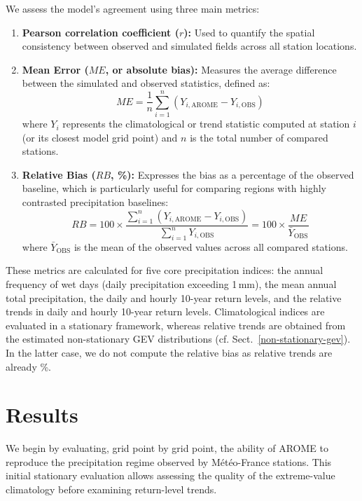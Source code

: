 \documentclass[hess, manuscript]{copernicus}
\begin{document}
We assess the model's agreement using three main metrics:
\begin{enumerate}
    \item \textbf{Pearson correlation coefficient ($r$):} Used to quantify the spatial consistency between observed and simulated fields across all station locations.
    \item \textbf{Mean Error ($ME$, or absolute bias):} Measures the average difference between the simulated and observed statistics, defined as:
    \begin{equation}
        ME = \frac{1}{n}\sum_{i=1}^{n} (Y_{i,\text{AROME}} - Y_{i,\text{OBS}})
    \end{equation}
    where $Y_i$ represents the climatological or trend statistic computed at station $i$ (or its closest model grid point) and $n$ is the total number of compared stations.
    \item \textbf{Relative Bias ($RB$, \%):} Expresses the bias as a percentage of the observed baseline, which is particularly useful for comparing regions with highly contrasted precipitation baselines:
    \begin{equation}
        RB = 100 \times \frac{\sum_{i=1}^{n} (Y_{i,\text{AROME}} - Y_{i,\text{OBS}})}{\sum_{i=1}^{n} Y_{i,\text{OBS}}} = 100 \times \frac{ME}{\bar{Y}_{\text{OBS}}}
    \end{equation}
    where $\bar{Y}_{\text{OBS}}$ is the mean of the observed values across all compared stations.
\end{enumerate}

These metrics are calculated for five core precipitation indices: the annual frequency of wet days (daily precipitation exceeding 1\,mm), the mean annual total precipitation, the daily and hourly 10-year return levels, and the relative trends in daily and hourly 10-year return levels. Climatological indices are evaluated in a stationary framework, whereas relative trends are obtained from the estimated non-stationary GEV distributions (cf. Sect.~\ref{non-stationary-gev}). In the latter case, we do not compute the relative bias as relative trends are already \%.

\section{Results}\label{results}

We begin by evaluating, grid point by grid point, the ability of AROME
to reproduce the precipitation regime observed by Météo-France stations.
This initial stationary evaluation allows assessing the quality of the extreme-value climatology before examining return-level trends.
\end{document}
